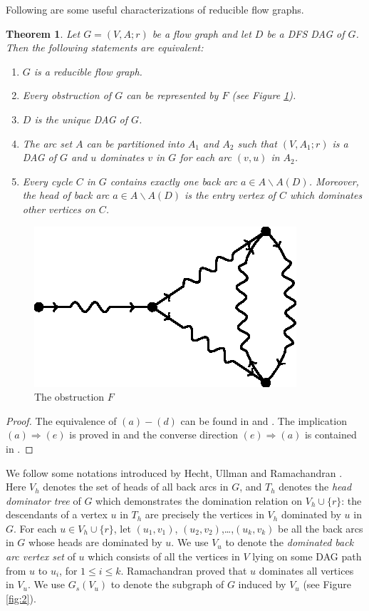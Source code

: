 \documentclass[11pt]{article}
\newtheorem{theorem}{Theorem}[section]
\begin{document}
Following are some useful characterizations of reducible flow graphs.
\begin{theorem}
\label{thm:1}
Let $G=(V,A;r)$ be a flow graph and let $D$ be a DFS DAG of $G$. Then the following statements are equivalent:
\begin{enumerate}[label=\emph{(}\alph*\emph{)}]
  \item $G$ is a reducible flow graph.
  \item Every obstruction of $G$ can be represented by $F$ (see Figure \ref{fig:1}).
  \item $D$ is the unique DAG of $G$.
  \item The arc set $A$ can be partitioned into $A_1$ and $A_2$ such that $(V,A_1;r)$ is a DAG of $G$ and $u$ dominates $v$ in $G$ for each arc $(v,u)$ in $A_2$.
  \item Every cycle $C$ in $G$ contains exactly one back arc $a\in A\backslash A(D)$. Moreover, the head of back arc $a\in A\backslash A(D)$ is the entry vertex of $C$ which dominates other vertices on $C$.
\end{enumerate}
\end{theorem}

\begin{figure}
\centering
\includegraphics{FASPacking-fig1.eps}
\caption{The obstruction $F$}
\label{fig:1}
\end{figure}

\begin{proof}
The equivalence of $(a)-(d)$ can be found in \cite{HecU1} and \cite{HecU2}. The implication $(a)\Rightarrow (e)$ is proved in \cite{Sham} and the converse direction $(e)\Rightarrow (a)$ is contained in \cite{CheZ}.
\end{proof}

We follow some notations introduced by Hecht, Ullman \cite{HecU1, HecU2} and Ramachandran \cite{Rama1,Rama2}. Here $V_h$ denotes the set of heads of all back arcs in $G$, and $T_h$ denotes the \emph{head dominator tree} of $G$ which demonstrates the domination relation on $V_h\cup \{r\}$: the descendants of a vertex $u$ in $T_h$ are precisely the vertices in $V_h$ dominated by $u$ in $G$. For each $u\in V_h\cup\{r\}$, let $(u_1,v_1)$, $(u_2,v_2)$,\dots,$(u_k,v_k)$ be all the back arcs in $G$ whose heads are dominated by $u$. We use $V_u$ to denote the \emph{dominated back arc vertex set} of $u$ which consists of all the vertices in $V$ lying on some DAG path from $u$ to $u_i$, for $1\leq i\leq k$. Ramachandran \cite{Rama1,Rama2} proved that $u$ dominates all vertices in $V_u$. We use $G_s(V_u)$ to denote the subgraph of $G$ induced by $V_u$ (see Figure \ref{fig:2}).
\end{document}
